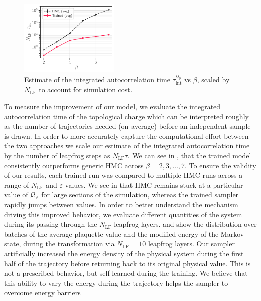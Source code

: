 \documentclass{article} %
\begin{document}
\begin{figure}
   \centering
      \centering
      \includegraphics[width=0.425\textwidth]{figures/autocorr_vs_beta.pdf}
      \caption{\label{fig:autocorrvsbeta}Estimate of the integrated autocorrelation time
      \(\tau_{\mathrm{int}}^{\mathcal{Q}_{\mathbb{R}}}\) vs \(\beta\), scaled by \(N_{\mathrm{LF}}\) to account for
   simulation cost.}
\end{figure}
To measure the improvement of our model, we evaluate the integrated autocorrelation time of the topological charge which
can be interpreted roughly as the number of trajectories needed (on average) before an independent sample is drawn.
%
In order to more accurately capture the computational effort between the two approaches we scale our estimate of the
integrated autocorrelation time by the number of leapfrog steps as \(N_{\mathrm{LF}}\tau\).  We can see in
, that the trained model consistently outperforms generic HMC across \(\beta = 2, 3, \ldots,
7\).
%
To ensure the validity of our results, each trained run was compared to multiple HMC runs across a range of
\(N_{\mathrm{LF}}\) and \(\varepsilon\) values.
%
We see in  that HMC remains stuck at a particular value of \(\mathcal{Q}_{\mathbb{Z}}\) for large
sections of the simulation, whereas the trained sampler rapidly jumps between values.
%
In order to better understand the mechanism driving this improved behavior, we evaluate different quantities of the
system during its passing through the $N_{\mathrm{LF}}$ leapfrog layers.
%
 and  show the distribution over batches of the average plaquette value and the
modified energy of the Markov state, during the transformation via $N_{\mathrm{LF}}=10$ leapfrog layers.
%
Our sampler artificially increased the energy density of the physical system during the first half of the trajectory
before returning back to its original physical value.  This is not a prescribed behavior, but self-learned during the
training.
%
We believe that this ability to vary the energy during the trajectory helps the sampler to overcome energy barriers
\end{document}
